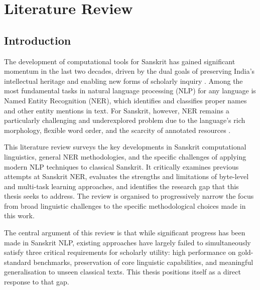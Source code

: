 
\chapter{Literature Review}
\label{chap:literature}

\section{Introduction}
\label{sec:intro_lit}

The development of computational tools for Sanskrit has gained significant momentum in the last two decades, driven by the dual goals of preserving India's intellectual heritage and enabling new forms of scholarly inquiry \cite{hellwig2010dcs, nehrdich2024byt5sanskrit}. Among the most fundamental tasks in natural language processing (NLP) for any language is Named Entity Recognition (NER), which identifies and classifies proper names and other entity mentions in text. For Sanskrit, however, NER remains a particularly challenging and underexplored problem due to the language's rich morphology, flexible word order, and the scarcity of annotated resources \cite{sarkar2025mahanama}.

This literature review surveys the key developments in Sanskrit computational linguistics, general NER methodologies, and the specific challenges of applying modern NLP techniques to classical Sanskrit. It critically examines previous attempts at Sanskrit NER, evaluates the strengths and limitations of byte-level and multi-task learning approaches, and identifies the research gap that this thesis seeks to address. The review is organised to progressively narrow the focus from broad linguistic challenges to the specific methodological choices made in this work.

The central argument of this review is that while significant progress has been made in Sanskrit NLP, existing approaches have largely failed to simultaneously satisfy three critical requirements for scholarly utility: high performance on gold-standard benchmarks, preservation of core linguistic capabilities, and meaningful generalisation to unseen classical texts. This thesis positions itself as a direct response to that gap.

